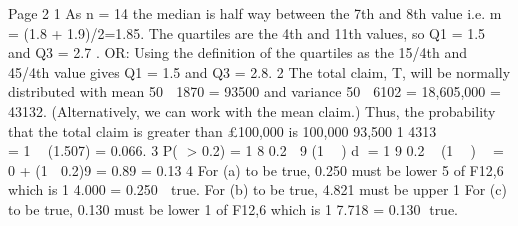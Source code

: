 \documentclass{article}
\begin{document}

Page 2
1 As n = 14 the median is half way between the 7th and 8th value
i.e. m = (1.8 + 1.9)/2=1.85.
The quartiles are the 4th and 11th values, so Q1 = 1.5 and Q3 = 2.7 .
OR: Using the definition of the quartiles as the 15/4th and 45/4th value gives
Q1 = 1.5 and Q3 = 2.8.
2 The total claim, T, will be normally distributed with mean 50  1870 = 93500
and variance 50  6102 = 18,605,000 = 43132.
(Alternatively, we can work with the mean claim.)
Thus, the probability that the total claim is greater than £100,000 is
100,000 93,500
1
4313
  
  
 
= 1  (1.507) = 0.066.
3 P( > 0.2) =
1
8
0.2
 9 (1  ) d
=
1
9
0.2
(1  ) 
= 0 + (1  0.2)9 = 0.89 = 0.13
4 For (a) to be true, 0.250 must be lower 5%
of F12,6 which is
1
4.000
= 0.250  true.
For (b) to be true, 4.821 must be upper 1%
For (c) to be true, 0.130 must be lower 1%
of F12,6 which is
1
7.718
= 0.130 true.


\end{document}
